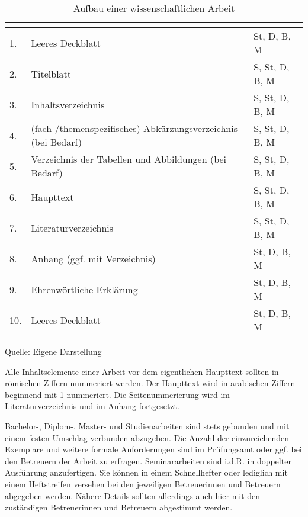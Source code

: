\documentclass[a4paper, 12pt]{article}
\renewcommand{\arraystretch}{1.0}
\begin{document}
\begin{center}
\begin{table}[h] \centering
\renewcommand{\arraystretch}{1.3}
\begin{tabular}{|l|l|l|}
\multicolumn{1}{c}{\hspace{2cm}} & \multicolumn{1}{c}{\hspace{5cm}} &
\multicolumn{1}{c}{\hspace{5cm}}\\ \hline 1. & Leeres Deckblatt & St, D, B, M \\
\hline
2. & Titelblatt & S, St, D, B, M \\
\hline 3. & Inhaltsverzeichnis & S, St, D, B, M
\\
\hline 4. & (fach-/themenspezifisches) Abk\"{u}rzungsverzeichnis (bei Bedarf) & S, St,
D,
B, M \\
\hline
5. & Verzeichnis der Tabellen und Abbildungen (bei Bedarf) & S, St, D, B, M \\
\hline
6. & Haupttext & S, St, D, B, M \\
\hline
7. & Literaturverzeichnis & S, St, D, B, M \\
\hline
8. & Anhang (ggf. mit Verzeichnis) & St, D, B, M \\
\hline
9. & Ehrenw\"{o}rtliche Erkl\"{a}rung & St, D, B, M \\
\hline 10. & Leeres Deckblatt & St, D, B, M \\
\hline
\end{tabular}
\singlespacing \caption{Aufbau einer wissenschaftlichen Arbeit}\label{Aufbau}
{Quelle: Eigene Darstellung}
\renewcommand{\arraystretch}{1.3}
\onehalfspacing
\end{table}
\end{center}

Alle Inhaltselemente einer Arbeit vor dem eigentlichen Haupttext sollten in
r\"{o}mischen Ziffern nummeriert werden. Der Haupttext wird in arabischen Ziffern
beginnend mit 1 nummeriert. Die Seitenummerierung wird im Literaturverzeichnis und
im Anhang fortgesetzt.

Bachelor-, Diplom-, Master- und Studienarbeiten sind stets gebunden und mit einem
festen Umschlag verbunden abzugeben. Die Anzahl der einzureichenden Exemplare und
weitere formale Anforderungen sind im Pr\"{u}fungsamt oder ggf. bei den Betreuern der
Arbeit zu erfragen. Seminararbeiten sind i.d.R. in doppelter Ausf\"{u}hrung
anzufertigen. Sie k\"{o}nnen in einem Schnellhefter oder lediglich mit einem
Heftstreifen versehen bei den jeweiligen Betreuerinnen und Betreuern abgegeben
werden. N\"{a}here Details sollten allerdings auch hier mit den zust\"{a}ndigen
Betreuerinnen und Betreuern abgestimmt werden.
\end{document}
